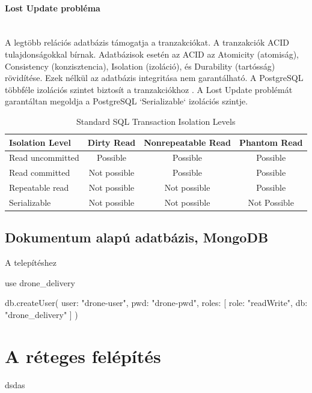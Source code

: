 \paragraph{Lost Update probléma} \mbox{} \\
A legtöbb relációs adatbázis támogatja a tranzakciókat. A tranzakciók ACID tulajdonságokkal bírnak.
Adatbázisok esetén az ACID az Atomicity (atomiság), Consistency (konzisztencia), Isolation (izoláció), és Durability (tartósság) rövidítése. Ezek nélkül az adatbázis integritása nem garantálható.
A PostgreSQL többféle izolációs szintet biztosít a tranzakciókhoz \cite{postgres-transaction}. A Lost Update problémát garantáltan megoldja a PostgreSQL `Serializable` izolációs szintje.
\begin{table}[h]
    \centering
    \caption{ Standard SQL Transaction Isolation Levels}
    \begin{tabular}{l|c|c|c|}
Isolation Level & Dirty Read  & Nonrepeatable Read & Phantom Read\\
        \hline
Read uncommitted  & Possible & Possible & Possible \\
\hline
Read committed & Not possible & Possible & Possible \\
\hline
Repeatable read & Not possible & Not possible & Possible \\
\hline
Serializable & Not possible & Not possible & Not Possible \\
        \hline
    \end{tabular}
\end{table}

\subsection{Dokumentum alapú adatbázis, MongoDB}

A telepítéshez
\begin{python}
    use drone_delivery
\end{python}

\begin{python}

    db.createUser(
        {
        user: "drone-user",
        pwd: "drone-pwd",
        roles: [
            {
            role: "readWrite",
            db: "drone_delivery"
        }
        ]
    }
    )
\end{python}

\section{A réteges felépítés}
dsdas


